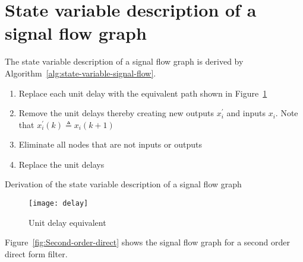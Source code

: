 \documentclass[a4paper,twoside,10pt,english]{report}
\begin{document}
\section{State variable description of a signal flow graph\label{sec:State-variable-description-of-a-signal-flow-graph}}
The state variable description of a signal flow graph is derived by
Algorithm~\ref{alg:state-variable-signal-flow}.
\begin{algorithm}[!htbp]
\begin{enumerate}
\item Replace each unit delay with the equivalent path shown in 
Figure~\ref{fig:Unit-delay-equivalent}
\item Remove the unit delays thereby creating new outputs $x_{i}^{\prime}$
and inputs $x_{i}$. Note that 
$x_{i}^{\prime}\left(k\right)\triangleq x_{i}\left(k+1\right)$
\item Eliminate all nodes that are not inputs or outputs
\item Replace the unit delays
\end{enumerate}
\caption{\label{alg:state-variable-signal-flow}Derivation of the state 
 variable  description of a signal flow graph}
\end{algorithm}

\begin{figure}[!htbp]
\begin{center}
\texttt{[image: delay]}
\caption{Unit delay equivalent}
\label{fig:Unit-delay-equivalent}
\end{center}
\end{figure}

Figure~\ref{fig:Second-order-direct} shows the signal flow graph
for a second order direct form filter. 
\end{document}
